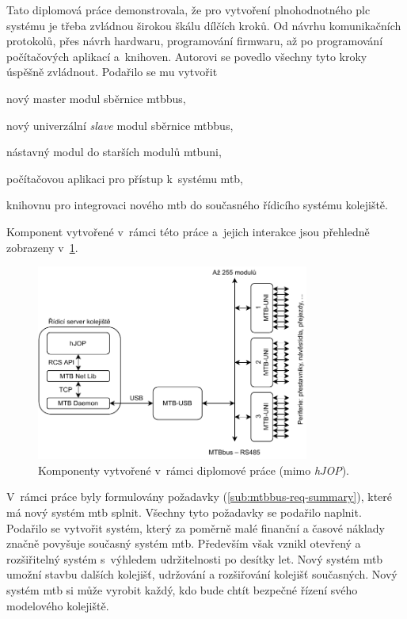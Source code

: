 Tato diplomová práce demonstrovala, že pro vytvoření plnohodnotného \gls{plc}
systému je třeba zvládnou širokou škálu dílčích kroků. Od návrhu komunikačních
protokolů, přes návrh hardwaru, programování firmwaru, až po programování
počítačových aplikací a~knihoven. Autorovi se povedlo všechny tyto kroky
úspěšně zvládnout. Podařilo se mu vytvořit

\begin{compactitem}
\item nový master modul sběrnice \gls{mtbbus},
\item nový univerzální \textit{slave} modul sběrnice \gls{mtbbus},
\item nástavný modul do starších modulů \gls{mtbuni},
\item počítačovou aplikaci pro přístup k~systému \gls{mtb},
\item knihovnu pro integrovaci nového \gls{mtb} do současného řídicího systému
	kolejiště.
\end{compactitem}

Komponent vytvořené v~rámci této práce a~jejich interakce jsou přehledně
zobrazeny v~\ref{fig:new-topology}.

\begin{figure}[ht]
\includegraphics[width=0.8\textwidth]{data/new-topology.pdf}
\caption{Komponenty vytvořené v~rámci diplomové práce (mimo \textit{hJOP}).}
\label{fig:new-topology}
\end{figure}

V~rámci práce byly formulovány požadavky (\ref{sub:mtbbus-req-summary}), které
má nový systém \gls{mtb} splnit. Všechny tyto požadavky se podařilo naplnit.
Podařilo se vytvořit systém, který za poměrně malé finanční a časové náklady
značně povyšuje současný systém \gls{mtb}. Především však vznikl otevřený
a rozšiřitelný systém s~výhledem udržitelnosti po desítky let. Nový systém
\gls{mtb} umožní stavbu dalších kolejišť, udržování a rozšiřování kolejišť
současných. Nový systém \gls{mtb} si může vyrobit každý, kdo bude chtít bezpečné
řízení svého modelového kolejiště.


